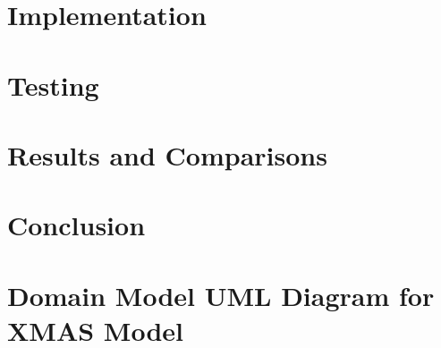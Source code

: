 \documentclass[10pt,twoside]{book}                  %
\begin{document}

















\chapter{Implementation}














\chapter{Testing}




\chapter{Results and Comparisons}




\chapter{Conclusion}

\texttt{\emph{}}

\appendix

\chapter{Domain Model UML Diagram for XMAS Model \label{sec:Domain-Model-UML}}
\end{document}
